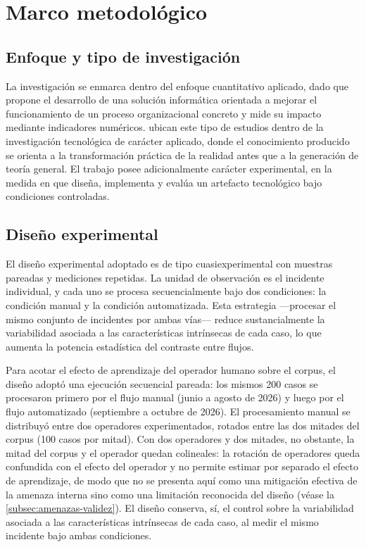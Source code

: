 \section{Marco metodológico}\label{sec:marco-metodologico}

\subsection{Enfoque y tipo de investigación}\label{subsec:enfoque-investigacion}

La investigación se enmarca dentro del enfoque cuantitativo aplicado, dado que propone el desarrollo de una solución informática orientada a mejorar el funcionamiento de un proceso organizacional concreto y mide su impacto mediante indicadores numéricos. \textcite{HernandezSampieri2018_metodologia} ubican este tipo de estudios dentro de la investigación tecnológica de carácter aplicado, donde el conocimiento producido se orienta a la transformación práctica de la realidad antes que a la generación de teoría general. El trabajo posee adicionalmente carácter experimental, en la medida en que diseña, implementa y evalúa un artefacto tecnológico bajo condiciones controladas.

\subsection{Diseño experimental}\label{subsec:diseno-experimental}

El diseño experimental adoptado es de tipo cuasiexperimental con muestras pareadas y mediciones repetidas. La unidad de observación es el incidente individual, y cada uno se procesa secuencialmente bajo dos condiciones: la condición manual y la condición automatizada. Esta estrategia ---procesar el mismo conjunto de incidentes por ambas vías--- reduce sustancialmente la variabilidad asociada a las características intrínsecas de cada caso, lo que aumenta la potencia estadística del contraste entre flujos.

Para acotar el efecto de aprendizaje del operador humano sobre el corpus, el diseño adoptó una ejecución secuencial pareada: los mismos 200 casos se procesaron primero por el flujo manual (junio a agosto de 2026) y luego por el flujo automatizado (septiembre a octubre de 2026). El procesamiento manual se distribuyó entre dos operadores experimentados, rotados entre las dos mitades del corpus (100 casos por mitad). Con dos operadores y dos mitades, no obstante, la mitad del corpus y el operador quedan colineales: la rotación de operadores queda confundida con el efecto del operador y no permite estimar por separado el efecto de aprendizaje, de modo que no se presenta aquí como una mitigación efectiva de la amenaza interna sino como una limitación reconocida del diseño (véase la \autoref{subsec:amenazas-validez}). El diseño conserva, sí, el control sobre la variabilidad asociada a las características intrínsecas de cada caso, al medir el mismo incidente bajo ambas condiciones.

